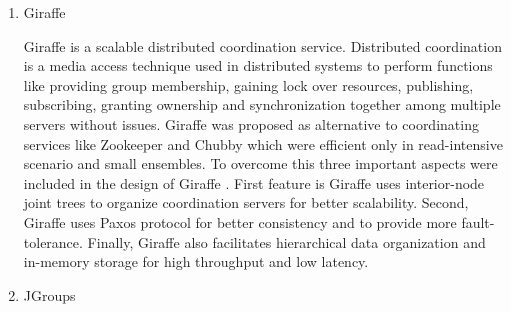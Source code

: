 \begin{enumerate}
\item {} 
Giraffe

Giraffe is a scalable distributed coordination
service. Distributed coordination is a media access technique
used in distributed systems to perform functions like providing
group membership, gaining lock over resources, publishing,
subscribing, granting ownership and synchronization together
among multiple servers without issues. Giraffe was proposed as
alternative to coordinating services like Zookeeper and Chubby
which were efficient only in read-intensive scenario and small
ensembles. To overcome this three important aspects were included
in the design of Giraffe \label{\detokenize{i524/technologies:id688}}{\hyperref[\detokenize{i524/technologies:giraffepaper}]{\sphinxcrossref{{[}599{]}}}}. First feature is
Giraffe uses interior-node joint trees to organize coordination
servers for better scalability. Second, Giraffe uses Paxos
protocol for better consistency and to provide more
fault-tolerance. Finally, Giraffe also facilitates hierarchical
data organization and in-memory storage for high throughput and
low latency.

\item {} 
JGroups

\end{enumerate}


